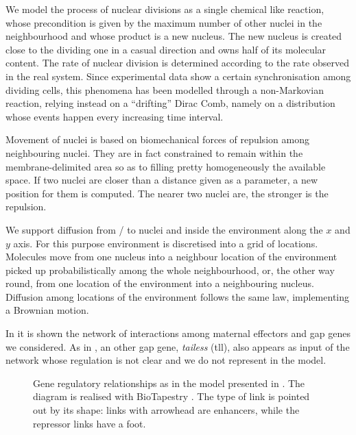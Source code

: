 \documentclass[12pt,a4paper,twoside,openright]{book}
\begin{document}
We model the process of nuclear divisions as a single chemical like reaction, whose precondition is given by the maximum number of other nuclei in the neighbourhood and whose product is a new nucleus. 
%
The new nucleus is created close to the dividing one in a casual direction and owns half of its molecular content.
%
The rate of nuclear division is determined according to the rate observed in the real system.
%
Since experimental data show a certain synchronisation among dividing cells, this phenomena has been modelled through a non-Markovian reaction, relying instead on a ``drifting'' Dirac Comb, namely on a distribution whose events happen every increasing time interval.

Movement of nuclei is based on biomechanical forces of repulsion among neighbouring nuclei. They are in fact constrained to remain within the membrane-delimited area so as to filling pretty homogeneously the available space.
%
If two nuclei are closer than a distance given as a parameter, a new position for them is computed. The nearer two nuclei are, the stronger is the repulsion.

We support diffusion from / to nuclei and inside the environment along the $x$ and $y$ axis.
%
For this purpose environment is discretised into a grid of locations.
%
Molecules move from one nucleus into a neighbour location of the environment picked up probabilistically among the whole neighbourhood, or, the other way round, from one location of the environment into a neighbouring nucleus.
%
Diffusion among locations of the environment follows the same law, implementing a Brownian motion.

In  it is shown the network of interactions among maternal effectors and gap genes we considered. As in \cite{perkins-compbio06}, an other gap gene, \emph{tailess} (tll), also  appears as input of the network whose regulation is not clear and we do not represent in the model. 

\begin{figure}
\caption[Gene regulatory relationships as in the model presented in \cite{perkins-compbio06,RiveraPomar,gursky04}]{Gene regulatory relationships as in the model presented in \cite{perkins-compbio06,RiveraPomar,gursky04}. The diagram is realised with BioTapestry \cite{biotapestry-2009}. The type of link is pointed out by its shape: links with arrowhead are enhancers, while the repressor links have a foot.}
\label{fig:genenetwork}
\end{figure}
\end{document}
